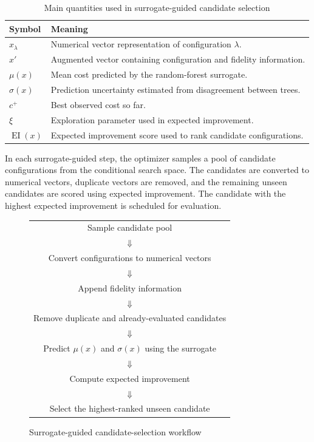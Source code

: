 \documentclass[12pt,a4paper,oneside]{report}
\begin{document}
\begin{table}[H]
\centering
\caption{Main quantities used in surrogate-guided candidate selection}
\label{tab:surrogate-quantities}
\renewcommand{\arraystretch}{1.2}
\begin{tabular}{p{}p{}}
\toprule
\textbf{Symbol} & \textbf{Meaning} \\
\midrule
\(x_{\lambda}\) &
Numerical vector representation of configuration \(\lambda\). \\

\(x'\) &
Augmented vector containing configuration and fidelity information. \\

\(\mu(x)\) &
Mean cost predicted by the random-forest surrogate. \\

\(\sigma(x)\) &
Prediction uncertainty estimated from disagreement between trees. \\

\(c^+\) &
Best observed cost so far. \\

\(\xi\) &
Exploration parameter used in expected improvement. \\

\(\operatorname{EI}(x)\) &
Expected improvement score used to rank candidate configurations. \\
\bottomrule
\end{tabular}
\end{table}

\noindent In each surrogate-guided step, the optimizer samples a pool of candidate
configurations from the conditional search space. The candidates are converted
to numerical vectors, duplicate vectors are removed, and the remaining unseen
candidates are scored using expected improvement. The candidate with the highest
expected improvement is scheduled for evaluation.

\begin{figure}[H]
\centering
\renewcommand{\arraystretch}{1.25}
\begin{tabular}{c}
Sample candidate pool \\
\(\Downarrow\) \\
Convert configurations to numerical vectors \\
\(\Downarrow\) \\
Append fidelity information \\
\(\Downarrow\) \\
Remove duplicate and already-evaluated candidates \\
\(\Downarrow\) \\
Predict \(\mu(x)\) and \(\sigma(x)\) using the surrogate \\
\(\Downarrow\) \\
Compute expected improvement \\
\(\Downarrow\) \\
Select the highest-ranked unseen candidate
\end{tabular}
\caption{Surrogate-guided candidate-selection workflow}
\label{fig:surrogate-candidate-selection}
\end{figure}
\end{document}
